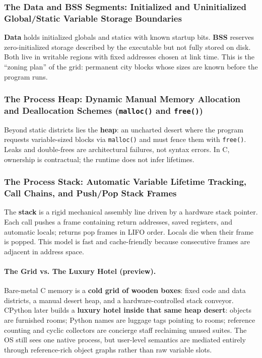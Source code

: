 \documentclass[a4paper,twoside]{report}
\begin{document}
\subsubsection{The Data and BSS Segments: Initialized and Uninitialized Global/Static Variable Storage Boundaries}

\textbf{Data} holds initialized globals and statics with known startup bits. \textbf{BSS} reserves zero-initialized storage described by the executable but not fully stored on disk. Both live in writable regions with fixed addresses chosen at link time. This is the ``zoning plan'' of the grid: permanent city blocks whose sizes are known before the program runs.

\subsubsection{The Process Heap: Dynamic Manual Memory Allocation and Deallocation Schemes (\texttt{malloc()} and \texttt{free()})}

Beyond static districts lies the \textbf{heap}: an uncharted desert where the program requests variable-sized blocks via \texttt{malloc()} and must fence them with \texttt{free()}. Leaks and double-frees are architectural failures, not syntax errors. In C, ownership is contractual; the runtime does not infer lifetimes.

\subsubsection{The Process Stack: Automatic Variable Lifetime Tracking, Call Chains, and Push/Pop Stack Frames}

The \textbf{stack} is a rigid mechanical assembly line driven by a hardware stack pointer. Each call pushes a frame containing return addresses, saved registers, and automatic locals; returns pop frames in LIFO order. Locals die when their frame is popped. This model is fast and cache-friendly because consecutive frames are adjacent in address space.

\paragraph{The Grid vs. The Luxury Hotel (preview).}
Bare-metal C memory is a \textbf{cold grid of wooden boxes}: fixed code and data districts, a manual desert heap, and a hardware-controlled stack conveyor. CPython later builds a \textbf{luxury hotel inside that same heap desert}: objects are furnished rooms; Python names are luggage tags pointing to rooms; reference counting and cyclic collectors are concierge staff reclaiming unused suites. The OS still sees one native process, but user-level semantics are mediated entirely through reference-rich object graphs rather than raw variable slots.
\end{document}
